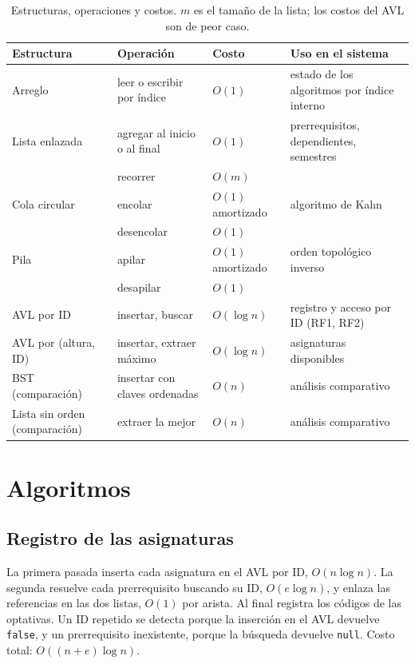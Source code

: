 \documentclass[11pt,letterpaper]{article}
\begin{document}
\begin{table}[H]
\centering
\small
\caption{Estructuras, operaciones y costos. $m$ es el tamaño de la lista; los costos del AVL son de peor caso.}
\label{tab:estructuras}
\begin{tabularx}{\linewidth}{@{}l l l L@{}}
\toprule
\textbf{Estructura} & \textbf{Operación} & \textbf{Costo} & \textbf{Uso en el sistema} \\
\midrule
Arreglo & leer o escribir por índice & $O(1)$ & estado de los algoritmos por índice interno \\
Lista enlazada & agregar al inicio o al final & $O(1)$ & prerrequisitos, dependientes, semestres \\
 & recorrer & $O(m)$ & \\
Cola circular & encolar & $O(1)$ amortizado & algoritmo de Kahn \\
 & desencolar & $O(1)$ & \\
Pila & apilar & $O(1)$ amortizado & orden topológico inverso \\
 & desapilar & $O(1)$ & \\
AVL por ID & insertar, buscar & $O(\log n)$ & registro y acceso por ID (RF1, RF2) \\
AVL por (altura, ID) & insertar, extraer máximo & $O(\log n)$ & asignaturas disponibles \\
BST (comparación) & insertar con claves ordenadas & $O(n)$ & análisis comparativo \\
Lista sin orden (comparación) & extraer la mejor & $O(n)$ & análisis comparativo \\
\bottomrule
\end{tabularx}
\end{table}

\section{Algoritmos}\label{sec:algoritmos}

\subsection{Registro de las asignaturas}
La primera pasada inserta cada asignatura en el AVL por ID, $O(n \log n)$. La segunda resuelve cada prerrequisito buscando su ID, $O(e \log n)$, y enlaza las referencias en las dos listas, $O(1)$ por arista. Al final registra los códigos de las optativas. Un ID repetido se detecta porque la inserción en el AVL devuelve \texttt{false}, y un prerrequisito inexistente, porque la búsqueda devuelve \texttt{null}. Costo total: $O((n + e) \log n)$.
\end{document}
